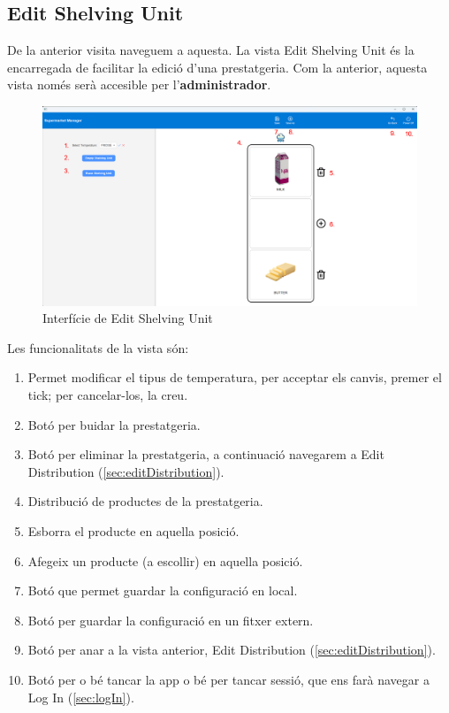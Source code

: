 \documentclass[a4paper,12pt]{article}
\begin{document}
	\newpage
	\subsection{Edit Shelving Unit}
	\label{sec:editShelvingUnit}
	
	De la anterior visita naveguem a aquesta. La vista Edit Shelving Unit és la encarregada de facilitar la edició d'una prestatgeria. Com la anterior, aquesta vista només serà accesible per l'\textbf{administrador}.
	
	\begin{figure}[H] 
		\centering
		\includegraphics[width=0.75\linewidth]{assets/editshelvingunit.png}
		\caption{Interfície de Edit Shelving Unit}
	\end{figure}
	
	\noindent Les funcionalitats de la vista són:
	
	\begin{enumerate}[itemsep=0pt, topsep=0pt]
		\item Permet modificar el tipus de temperatura, per acceptar els canvis, premer el tick; per cancelar-los, la creu.
		\item Botó per buidar la prestatgeria.
		\item Botó per eliminar la prestatgeria, a continuació navegarem a Edit Distribution (\ref{sec:editDistribution}).
		\item Distribució de productes de la prestatgeria.
		\item Esborra el producte en aquella posició.
		\item Afegeix un producte (a escollir) en aquella posició.
		\item Botó que permet guardar la configuració en local.
		\item Botó per guardar la configuració en un fitxer extern.
		\item Botó per anar a la vista anterior, Edit Distribution (\ref{sec:editDistribution}).
		\item Botó per o bé tancar la app o bé per tancar sessió, que ens farà navegar a Log In (\ref{sec:logIn}).
		
	\end{enumerate}
	
\end{document}
